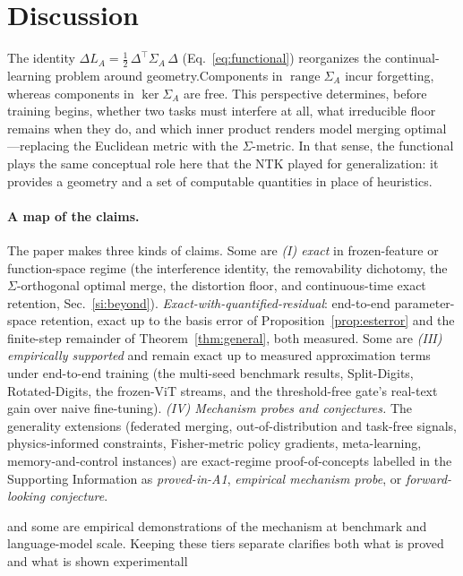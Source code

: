 \documentclass[10pt,a4paper]{article}
\theoremstyle{plain}
\theoremstyle{definition}
\newcommand{\Sig}{\Sigma}
\newcommand{\Del}{\Delta}
\DeclareMathOperator{\range}{range}
\begin{document}
\section{Discussion}
\label{sec:discussion}

The identity $\Del L_A=\tfrac12\,\Del^\top\Sig_A\,\Del$ (Eq.~\eqref{eq:functional}) reorganizes the continual-learning
problem around geometry.Components in $\range\Sig_A$ incur forgetting, whereas components in $\ker\Sig_A$ are free.
This perspective determines, before training begins, whether two tasks must interfere at all, what
irreducible floor remains when they do, and which inner product renders model merging
optimal---replacing the Euclidean metric with the $\Sig$-metric. In that
sense, the functional plays the same conceptual role here that the NTK \cite{jacot2018}
played for generalization: it provides a geometry and a set of computable quantities in
place of heuristics.

\paragraph{A map of the claims.} The paper makes three kinds of claims.  Some are
\emph{(I) exact} in frozen-feature or function-space regime (the interference identity, the removability dichotomy, the
$\Sig$-orthogonal optimal merge, the distortion floor, and continuous-time exact
retention, Sec.~\ref{si:beyond}). \emph{Exact-with-quantified-residual}: end-to-end parameter-space
retention, exact up to the basis error of Proposition~\ref{prop:esterror} and the
finite-step remainder of Theorem~\ref{thm:general}, both measured. Some are  \emph{(III)
empirically supported} and remain exact up to measured approximation terms under end-to-end training (the multi-seed benchmark results, Split-Digits, Rotated-Digits,
the frozen-ViT streams, and the threshold-free gate's real-text gain over naive
fine-tuning). \emph{(IV) Mechanism probes and
conjectures.} The generality extensions (federated merging, out-of-distribution and
task-free signals, physics-informed constraints, Fisher-metric policy gradients,
meta-learning, memory-and-control instances) are exact-regime proof-of-concepts
labelled in the Supporting Information as \emph{proved-in-A1}, \emph{empirical mechanism
probe}, or \emph{forward-looking conjecture}.

 and some are empirical demonstrations of the mechanism at benchmark and language-model scale. Keeping these tiers separate clarifies both what is proved and what is shown experimentall
\end{document}
